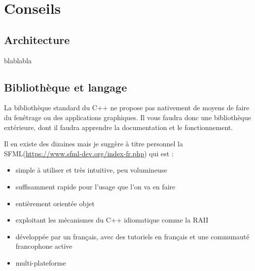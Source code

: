 \documentclass[a4paper, 11pt]{article}
\begin{document}
\section*{Conseils}  
\subsection{Architecture}  
  
blablabla

\subsection{Bibliothèque et langage}  
  
La bibliothèque standard du C++ ne propose pas nativement de moyens de faire du fenêtrage ou des applications graphiques. Il vous faudra donc une bibliothèque extérieure, dont il faudra apprendre la documentation et le fonctionnement.

Il en existe des dizaines mais je suggère à titre personnel la SFML(\url{https://www.sfml-dev.org/index-fr.php}) qui est :  
  
\begin{itemize}
\item simple à utiliser et très intuitive, peu volumineuse
\item suffisamment rapide pour l'usage que l'on va en faire
\item entièrement orientée objet
\item exploitant les mécanismes du C++ idiomatique comme la RAII
\item développée par un français, avec des tutoriels en français et une communauté francophone active
\item multi-plateforme
\end{itemize}
\end{document}
